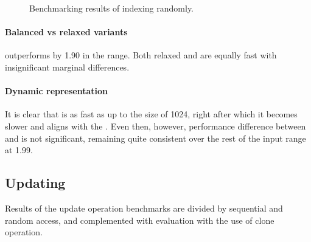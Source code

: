 \begin{figure}[t]

    \caption{Benchmarking results of indexing randomly.}
    \label{fig:index-randomly}
\end{figure}

\paragraph{Balanced vs relaxed variants}
\rbvec{} outperforms \rrbvec{} by 1.90 in the \range{[100, \mega{1}]} range. Both relaxed \rrbvec{} and \imrsvec{} are equally fast with insignificant marginal differences.

\paragraph{Dynamic representation}
It is clear that \pvec{} is as fast as \stdvec{} up to the size of 1024, right after which it becomes slower and aligns with the \rrbvec{}. Even then, however, performance difference between \stdvec{} and \pvec{} is not significant, remaining quite consistent over the rest of the input range at 1.99. 

\subsection{Updating}
Results of the update operation benchmarks are divided by sequential and random access, and complemented with evaluation with the use of clone operation. 

